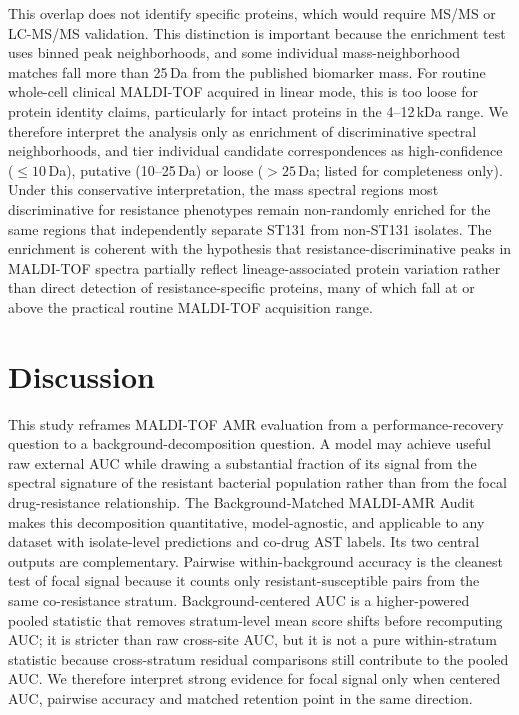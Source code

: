 \documentclass[11pt]{article}
\begin{document}
This overlap does not identify specific proteins, which would require MS/MS or LC-MS/MS validation. This distinction is important because the enrichment test uses binned peak neighborhoods, and some individual mass-neighborhood matches fall more than 25\,Da from the published biomarker mass. For routine whole-cell clinical MALDI-TOF acquired in linear mode, this is too loose for protein identity claims, particularly for intact proteins in the 4--12\,kDa range. We therefore interpret the analysis only as enrichment of discriminative spectral neighborhoods, and tier individual candidate correspondences as high-confidence ($\leq 10$\,Da), putative (10--25\,Da) or loose ($>25$\,Da; listed for completeness only). Under this conservative interpretation, the mass spectral regions most discriminative for resistance phenotypes remain non-randomly enriched for the same regions that independently separate ST131 from non-ST131 isolates. The enrichment is coherent with the hypothesis that resistance-discriminative peaks in MALDI-TOF spectra partially reflect lineage-associated protein variation rather than direct detection of resistance-specific proteins, many of which fall at or above the practical routine MALDI-TOF acquisition range.

\section*{Discussion}

This study reframes MALDI-TOF AMR evaluation from a performance-recovery question to a background-decomposition question. A model may achieve useful raw external AUC while drawing a substantial fraction of its signal from the spectral signature of the resistant bacterial population rather than from the focal drug-resistance relationship. The Background-Matched MALDI-AMR Audit makes this decomposition quantitative, model-agnostic, and applicable to any dataset with isolate-level predictions and co-drug AST labels. Its two central outputs are complementary. Pairwise within-background accuracy is the cleanest test of focal signal because it counts only resistant-susceptible pairs from the same co-resistance stratum. Background-centered AUC is a higher-powered pooled statistic that removes stratum-level mean score shifts before recomputing AUC; it is stricter than raw cross-site AUC, but it is not a pure within-stratum statistic because cross-stratum residual comparisons still contribute to the pooled AUC. We therefore interpret strong evidence for focal signal only when centered AUC, pairwise accuracy and matched retention point in the same direction.
\end{document}
